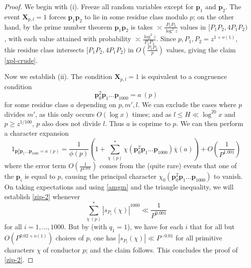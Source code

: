 \documentclass[12pt]{amsart}
\begin{document}
\begin{proof}  We begin with (i). Freeze all random variables except for $\mathbf{p}_1$ and $\mathbf{p}_2$.  The event $\mathbf{X}_{p,l}=1$ forces $\mathbf{p}_1\mathbf{p}_2$ to lie in some residue class modulo $p$; on the other hand, by the prime number theorem $\mathbf{p}_1\mathbf{p}_2$ is takes $\asymp \frac{P_1 P_2}{\log^2 z}$ values in $[P_1P_2, 4P_1P_2)$, with each value attained with probability $\asymp \frac{\log^2 z}{P_1 P_2}$.  Since $p, P_1, P_2 = z^{1+o(1)}$, this residue class intersects $[P_1P_2, 4P_1P_2)$ in $O( \frac{P_1 P_2}{p} )$ values, giving the claim \eqref{xpl-crude}.

Now we establish (ii).  The condition $\mathbf{X}_{p,l}=1$ is equivalent to a congruence condition
$$ \mathbf{p}_0^2 \mathbf{p}_1 \dots \mathbf{p}_{1000} = a\ (p)$$
for some residue class $a$ depending on $p, m', l$.  We can exclude the cases where $p$ divides $m'$, as this only occurs $O(\log x)$ times; and as $l \leq H \ll \log^{20} x$ and $p \geq z^{1/100}$, $p$ also does not divide $l$.  Thus $a$ is coprime to $p$.  We can then perform a character expansion
$$ 1_{\mathbf{p}_0^2\mathbf{p}_1 \dots \mathbf{p}_{1000} = a\ (p)} = \frac{1}{\phi(p)} \left(1  + \sum_{\chi\ (p)}^* \chi(\mathbf{p}_0^2\mathbf{p}_1 \dots \mathbf{p}_{1000}) \overline{\chi}(a) \right) + O\left(\frac{1}{P^{1.001}}\right) $$
where the error term $O\left(\frac{1}{P^{1.001}}\right)$ comes from the (quite rare) events that one of the $\mathbf{p}_i$ is equal to $p$, causing the principal character $\chi_0(\mathbf{p}_0^2\mathbf{p}_1 \dots \mathbf{p}_{1000})$ to vanish.  On taking expectations and using \eqref{amgm} and the triangle inequality, we will establish \eqref{zip-2} whenever
\begin{equation}\label{ta}
\sum_{\chi\ (p)}^* |s_{P_i}(\chi)|^{1000} \ll \frac{1}{P^{0.001}}
\end{equation}
for all $i=1,\dots,1000$.
But by  (with $q_1=1$), we have for each $i$ that for all but $O(P^{0.02+o(1)})$ choices of $p$, one has $|s_{P_i}(\chi)| \ll P^{-0.01}$ for all primitive characters $\chi$ of conductor $p$; and the claim follows.  This concludes the proof of \eqref{zip-2}.
\end{proof}
\end{document}
